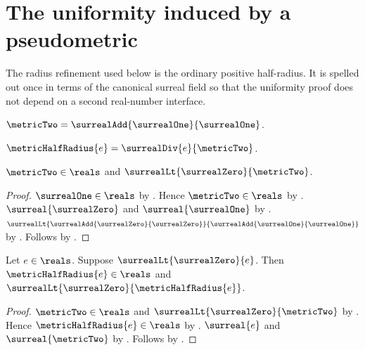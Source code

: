 


\section{The uniformity induced by a pseudometric}

The radius refinement used below is the ordinary positive half-radius.  It is
spelled out once in terms of the canonical surreal field so that the
uniformity proof does not depend on a second real-number interface.

\begin{definition}\label{metric_two}
    $\metricTwo=\surrealAdd{\surrealOne}{\surrealOne}$.
\end{definition}

\begin{definition}\label{metric_half_radius}
    $\metricHalfRadius{e}=\surrealDiv{e}{\metricTwo}$.
\end{definition}

\begin{proposition}\label{metric_two_is_positive_real}
    $\metricTwo\in\reals$ and
        $\surrealLt{\surrealZero}{\metricTwo}$.
\end{proposition}
\begin{proof}
    $\surrealOne\in\reals$ by .
    Hence $\metricTwo\in\reals$
        by .
    $\surreal{\surrealZero}$ and $\surreal{\surrealOne}$
        by .
    $\surrealLt
        {\surrealAdd{\surrealZero}{\surrealZero}}
        {\surrealAdd{\surrealOne}{\surrealOne}}$
        by .
    Follows by
        .
\end{proof}

\begin{proposition}\label{metric_half_radius_positive_real}
    Let $e\in\reals$.
    Suppose $\surrealLt{\surrealZero}{e}$.
    Then $\metricHalfRadius{e}\in\reals$ and
        $\surrealLt{\surrealZero}{\metricHalfRadius{e}}$.
\end{proposition}
\begin{proof}
    $\metricTwo\in\reals$ and
        $\surrealLt{\surrealZero}{\metricTwo}$
        by .
    Hence $\metricHalfRadius{e}\in\reals$
        by
        .
    $\surreal{e}$ and $\surreal{\metricTwo}$
        by .
    Follows by
        .
\end{proof}

